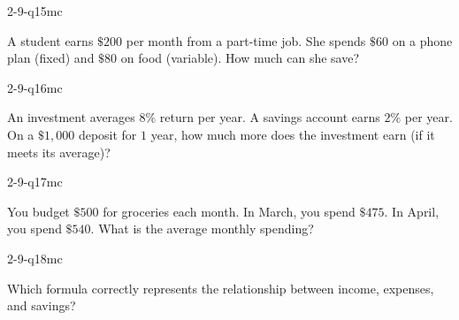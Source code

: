 \begin{practiceQuestion}{2-9-q15}{mc}
\begin{questionText}
A student earns $\$200$ per month from a part-time job. She spends $\$60$ on a phone plan (fixed) and $\$80$ on food (variable). How much can she save?
\end{questionText}
\end{practiceQuestion}

\begin{practiceQuestion}{2-9-q16}{mc}
\begin{questionText}
An investment averages $8\%$ return per year. A savings account earns $2\%$ per year. On a $\$1{,}000$ deposit for $1$ year, how much more does the investment earn (if it meets its average)?
\end{questionText}
\end{practiceQuestion}

\begin{practiceQuestion}{2-9-q17}{mc}
\begin{questionText}
You budget $\$500$ for groceries each month. In March, you spend $\$475$. In April, you spend $\$540$. What is the average monthly spending?
\end{questionText}
\end{practiceQuestion}

\begin{practiceQuestion}{2-9-q18}{mc}
\begin{questionText}
Which formula correctly represents the relationship between income, expenses, and savings?
\end{questionText}
\end{practiceQuestion}



